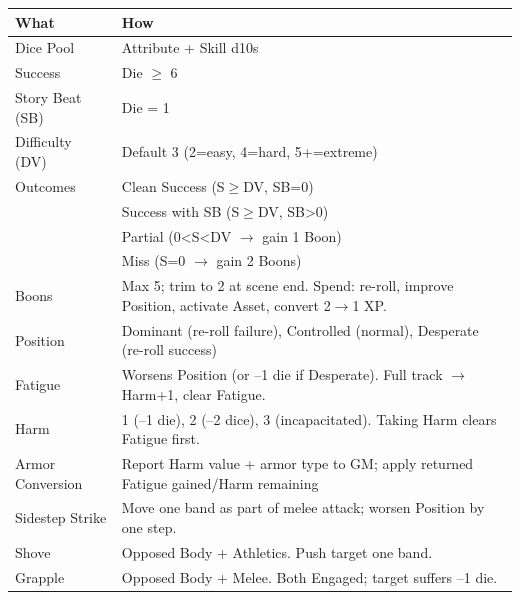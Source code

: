 \begin{tcolorbox}[colback=black!5!white,colframe=black!60!white,title=\textbf{Core Mechanics Quick Reference},breakable]
  \begin{center}
  \small
  \begin{tabular}{ll}
  \toprule
  \textbf{What} & \textbf{How} \\
  \midrule
  Dice Pool & Attribute + Skill d10s \\
  Success & Die $\geq$ 6 \\
  Story Beat (SB) & Die = 1 \\
  Difficulty (DV) & Default 3 (2=easy, 4=hard, 5+=extreme) \\
  Outcomes & Clean Success (S$\geq$DV, SB=0) \\ & Success with SB (S$\geq$DV, SB>0) \\ & Partial (0<S<DV $\rightarrow$ gain 1 Boon) \\ & Miss (S=0 $\rightarrow$ gain 2 Boons) \\
  Boons & Max 5; trim to 2 at scene end. Spend: re-roll, improve Position, activate Asset, convert 2$\rightarrow$1 XP. \\
  Position & Dominant (re-roll failure), Controlled (normal), Desperate (re-roll success) \\
  Fatigue & Worsens Position (or --1 die if Desperate). Full track $\rightarrow$ Harm+1, clear Fatigue. \\
  Harm & 1 (--1 die), 2 (--2 dice), 3 (incapacitated). Taking Harm clears Fatigue first. \\
  Armor Conversion & Report Harm value + armor type to GM; apply returned Fatigue gained/Harm remaining \\
  Sidestep Strike & Move one band as part of melee attack; worsen Position by one step. \\
  Shove & Opposed Body + Athletics. Push target one band. \\
  Grapple & Opposed Body + Melee. Both Engaged; target suffers --1 die. \\
  \bottomrule
  \end{tabular}
  \end{center}
\end{tcolorbox}
